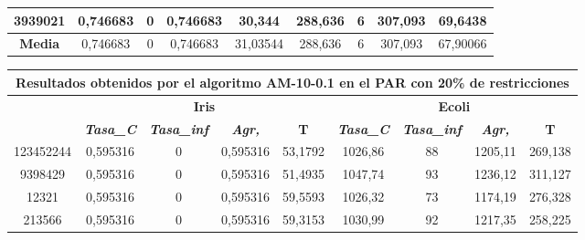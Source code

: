 \documentclass[12pt, spanish]{article}
\begin{document}
\begin{table}[H]
\begin{tabular}{|c|c|c|c|c|c|c|c|c|}
3939021           & 0,746683                  & 0                           & 0,746683               & 30,344     & 288,636                   & 6                           & 307,093                & 69,6438    \\ \hline
\textbf{Media}    & 0,746683                  & 0                           & 0,746683               & 31,03544   & 288,636                   & 6                           & 307,093                & 67,90066   \\ \hline
\end{tabular}
\end{table}

\begin{table}[H]
\footnotesize
\begin{tabular}{|c|c|c|c|c|c|c|c|c|}
\hline
\multicolumn{9}{|c|}{\textbf{Resultados obtenidos por el algoritmo AM-10-0.1 en el PAR con 20\% de restricciones}}                                                                                                \\ \hline
\multirow{2}{*}{} & \multicolumn{4}{c|}{\textbf{Iris}}                                                            & \multicolumn{4}{c|}{\textbf{Ecoli}}                                                           \\ \cline{2-9} 
                  & \textit{\textbf{Tasa\_C}} & \textit{\textbf{Tasa\_inf}} & \textit{\textbf{Agr,}} & \textbf{T} & \textit{\textbf{Tasa\_C}} & \textit{\textbf{Tasa\_inf}} & \textit{\textbf{Agr,}} & \textbf{T} \\ \hline
123452244         & 0,595316                  & 0                           & 0,595316               & 53,1792    & 1026,86                   & 88                          & 1205,11                & 269,138    \\ \hline
9398429           & 0,595316                  & 0                           & 0,595316               & 51,4935    & 1047,74                   & 93                          & 1236,12                & 311,127    \\ \hline
12321             & 0,595316                  & 0                           & 0,595316               & 59,5593    & 1026,32                   & 73                          & 1174,19                & 276,328    \\ \hline
213566            & 0,595316                  & 0                           & 0,595316               & 59,3153    & 1030,99                   & 92                          & 1217,35                & 258,225    \\ \hline

\end{tabular}
\end{table}
\end{document}
